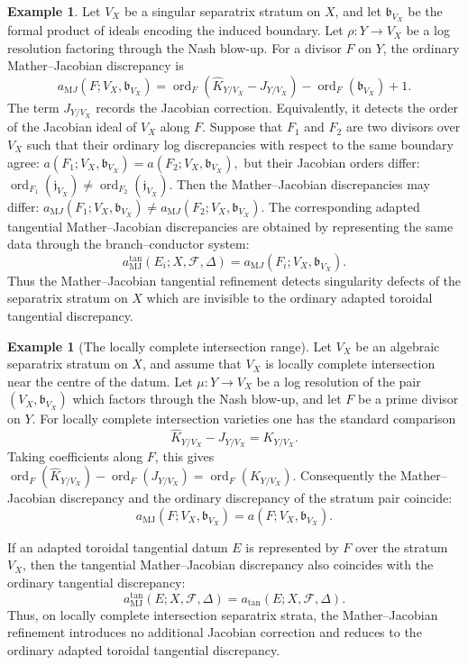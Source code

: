 \documentclass[11pt]{amsart}
\numberwithin{equation}{section}
\theoremstyle{plain}
\theoremstyle{definition}
\newtheorem{Example}[Theorem]{Example}
\newcommand{\ord}{\operatorname{ord}}
\newcommand{\MJ}{\mathrm{MJ}}
\newcommand{\bbound}{\mathfrak b}
\newcommand{\cF}{\mathcal F}
\newcommand{\jaco}{\mathfrak j}
\begin{document}
\begin{Example}
Let $V_X$ be a
singular separatrix stratum on $X$, and let $\bbound_{V_X}$ be the
formal product of ideals encoding the induced boundary. Let
$
\rho:Y\to V_X
$
be a log resolution factoring through the Nash blow-up. For a divisor $F$
on $Y$, the ordinary Mather--Jacobian discrepancy is
\[
a_{\mathrm MJ}(F;V_X,\bbound_{V_X})
=
\ord_F(\widehat K_{Y/V_X}-J_{Y/V_X})
-
\ord_F(\bbound_{V_X})
+
1.
\]
The term $J_{Y/V_X}$ records the Jacobian correction. Equivalently, it
detects the order of the Jacobian ideal of $V_X$ along $F$.
Suppose that $F_1$ and $F_2$ are two divisors over $V_X$ such that their
ordinary log discrepancies with respect to the same boundary agree:
$
a(F_1;V_X,\bbound_{V_X})=
a(F_2;V_X,\bbound_{V_X}),
$
but their Jacobian orders differ:
$
\ord_{F_1}(\jaco_{V_X})\ne \ord_{F_2}(\jaco_{V_X}).
$
Then the Mather--Jacobian discrepancies may differ:
$
a_{\mathrm MJ}(F_1;V_X,\bbound_{V_X})
\ne
a_{\mathrm MJ}(F_2;V_X,\bbound_{V_X}).
$
The corresponding adapted tangential Mather--Jacobian discrepancies are
obtained by representing the same data through the branch--conductor system:
\[
a^{\tan}_{\MJ}(E_i;X,\cF,\Delta)
=
a_{\mathrm MJ}(F_i;V_X,\bbound_{V_X}).
\]
Thus the Mather--Jacobian tangential refinement detects singularity defects
of the separatrix stratum on $X$ which are invisible to the ordinary
adapted toroidal tangential discrepancy.
\end{Example}

\begin{Example}[The locally complete intersection range]
Let \(V_X\) be an algebraic separatrix stratum on \(X\), and assume that
\(V_X\) is locally complete intersection near the centre of the datum.  Let
$
\mu:Y\longrightarrow V_X
$
be a log resolution of the pair \((V_X,\bbound_{V_X})\) which factors through
the Nash blow-up, and let \(F\) be a prime divisor on \(Y\).  For locally
complete intersection varieties one has the standard comparison
\[
\widehat K_{Y/V_X}-J_{Y/V_X}=K_{Y/V_X}.
\]
Taking coefficients along \(F\), this gives
$
\ord_F(\widehat K_{Y/V_X})
-
\ord_F(J_{Y/V_X})
=
\ord_F(K_{Y/V_X}).
$
Consequently the Mather--Jacobian discrepancy and the ordinary discrepancy
of the stratum pair coincide:
\[
a_{\MJ}(F;V_X,\bbound_{V_X})
=
a(F;V_X,\bbound_{V_X}).
\]

If an adapted toroidal tangential datum \(E\) is represented by \(F\) over
the stratum \(V_X\), then the tangential Mather--Jacobian discrepancy also
coincides with the ordinary tangential discrepancy:
\[
a^{\tan}_{\MJ}(E;X,\cF,\Delta)
=
a_{\tan}(E;X,\cF,\Delta).
\]
Thus, on locally complete intersection separatrix strata, the
Mather--Jacobian refinement introduces no additional Jacobian correction and
reduces to the ordinary adapted toroidal tangential discrepancy.
\end{Example}
\end{document}
